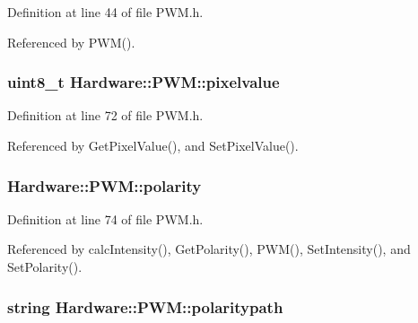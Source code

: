 Definition at line 44 of file P\+W\+M.\+h.



Referenced by P\+W\+M().

\hypertarget{class_hardware_1_1_p_w_m_a27de0bd1068a57a970d21bbbe4fc0872}{}
\subsubsection[{pixelvalue}]{\setlength{\rightskip}{0pt plus 5cm}uint8\+\_\+t Hardware\+::\+P\+W\+M\+::pixelvalue\hspace{0.3cm}{\ttfamily [private]}}\label{class_hardware_1_1_p_w_m_a27de0bd1068a57a970d21bbbe4fc0872}


Definition at line 72 of file P\+W\+M.\+h.



Referenced by Get\+Pixel\+Value(), and Set\+Pixel\+Value().

\hypertarget{class_hardware_1_1_p_w_m_ad346586d086f8462c3de6a4c19edb1d3}{}
\subsubsection[{polarity}]{ Hardware\+::\+P\+W\+M\+::polarity\hspace{0.3cm}{\ttfamily [private]}}\label{class_hardware_1_1_p_w_m_ad346586d086f8462c3de6a4c19edb1d3}


Definition at line 74 of file P\+W\+M.\+h.



Referenced by calc\+Intensity(), Get\+Polarity(), P\+W\+M(), Set\+Intensity(), and Set\+Polarity().

\hypertarget{class_hardware_1_1_p_w_m_ace89c96484ffa9d6c9f3a8067848bf51}{}
\subsubsection[{polaritypath}]{\setlength{\rightskip}{0pt plus 5cm}string Hardware\+::\+P\+W\+M\+::polaritypath\hspace{0.3cm}{\ttfamily [private]}}\label{class_hardware_1_1_p_w_m_ace89c96484ffa9d6c9f3a8067848bf51}


